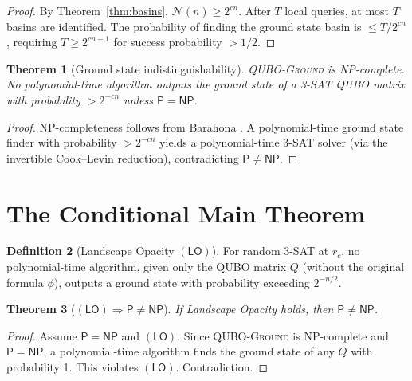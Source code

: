 \documentclass[11pt,a4paper]{article}
\theoremstyle{plain}
\newtheorem{theorem}{Theorem}[section]
\theoremstyle{definition}
\newtheorem{definition}[theorem]{Definition}
\theoremstyle{remark}
\begin{document}
\begin{proof}
By Theorem~\ref{thm:basins}, $\mathcal{N}(n) \geq 2^{cn}$. After $T$ local queries, at most $T$ basins are identified. The probability of finding the ground state basin is $\leq T/2^{cn}$, requiring $T \geq 2^{cn-1}$ for success probability $> 1/2$.
\end{proof}

\begin{theorem}[Ground state indistinguishability]\label{thm:indistinguish}
\textsc{QUBO-Ground} is NP-complete. No polynomial-time algorithm outputs the ground state of a 3-SAT QUBO matrix with probability $> 2^{-cn}$ unless $\mathsf{P} = \mathsf{NP}$.
\end{theorem}

\begin{proof}
NP-completeness follows from Barahona \cite{Barahona1982}. A polynomial-time ground state finder with probability $> 2^{-cn}$ yields a polynomial-time 3-SAT solver (via the invertible Cook--Levin reduction), contradicting $\mathsf{P} \neq \mathsf{NP}$.
\end{proof}

\section{The Conditional Main Theorem}

\begin{definition}[Landscape Opacity $(\mathsf{LO})$]
For random 3-SAT at $r_c$, no polynomial-time algorithm, given only the QUBO matrix $Q$ (without the original formula $\phi$), outputs a ground state with probability exceeding $2^{-n/2}$.
\end{definition}

\begin{theorem}[$(\mathsf{LO}) \Rightarrow \mathsf{P} \neq \mathsf{NP}$]\label{thm:main}
If Landscape Opacity holds, then $\mathsf{P} \neq \mathsf{NP}$.
\end{theorem}

\begin{proof}
Assume $\mathsf{P} = \mathsf{NP}$ and $(\mathsf{LO})$. Since \textsc{QUBO-Ground} is NP-complete and $\mathsf{P} = \mathsf{NP}$, a polynomial-time algorithm finds the ground state of any $Q$ with probability 1. This violates $(\mathsf{LO})$. Contradiction.
\end{proof}
\end{document}

